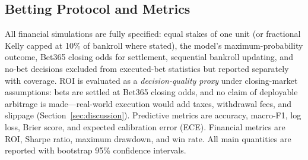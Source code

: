 \subsection{Betting Protocol and Metrics}
\label{sec:protocol}
All financial simulations are fully specified: equal stakes of one
unit (or fractional Kelly capped at 10\% of bankroll where stated),
the model's maximum-probability outcome, Bet365 closing odds for
settlement, sequential bankroll updating, and no-bet decisions
excluded from executed-bet statistics but reported separately with
coverage. ROI is evaluated as a \emph{decision-quality proxy} under
closing-market assumptions: bets are settled at Bet365 closing odds,
and no claim of deployable arbitrage is made---real-world execution
would add taxes, withdrawal fees, and slippage
(Section~\ref{sec:discussion}). Predictive metrics are accuracy,
macro-F1, log loss, Brier score, and expected calibration error
(ECE). Financial metrics are ROI, Sharpe ratio, maximum drawdown,
and win rate. All main quantities are reported with bootstrap 95\%
confidence intervals.
